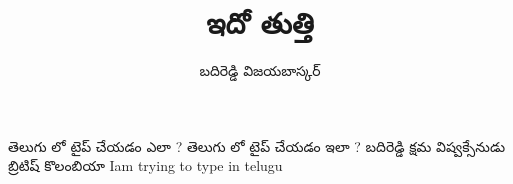 \documentclass[12pt]{article}
\title{ఇదో తుత్తి}
\author{బదిరెడ్డి విజయబాస్కర్}
\begin{document}
\maketitle
తెలుగు లో టైప్ చేయడం ఎలా ?
తెలుగు లో టైప్ చేయడం ఇలా ?
బదిరెడ్డి క్షమ విష్వక్సేనుడు బ్రిటిష్ కొలంబియా
Iam trying to type in telugu
\end{document}
